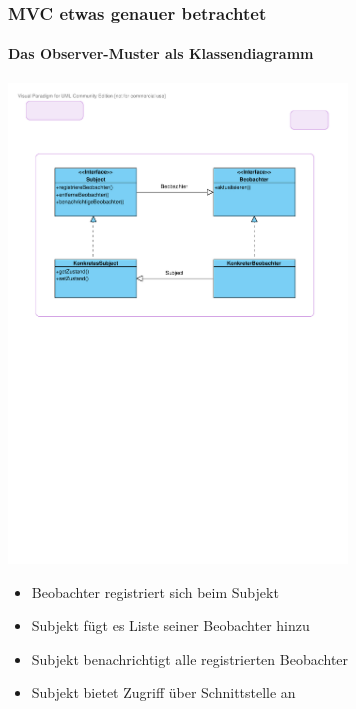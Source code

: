 \begin{frame}
	\frametitle{MVC etwas genauer betrachtet}
	\framesubtitle{Das Observer-Muster als Klassendiagramm}
	\begin{center}
		\includegraphics[trim = 18mm 155mm 22mm 45mm, clip, width=9cm]{../mvc/observer-kd.pdf}
	\end{center}	
	\begin{itemize}
		\item Beobachter registriert sich beim Subjekt
		\item Subjekt fügt es Liste seiner Beobachter hinzu
		\item Subjekt benachrichtigt alle registrierten Beobachter
		\item Subjekt bietet Zugriff über Schnittstelle an
	\end{itemize}
\end{frame}

